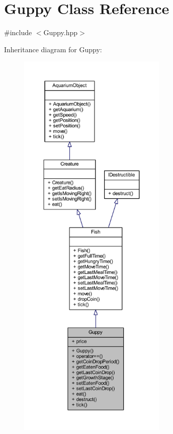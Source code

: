 \hypertarget{class_guppy}{}\section{Guppy Class Reference}
\label{class_guppy}


{\ttfamily \#include $<$Guppy.\+hpp$>$}



Inheritance diagram for Guppy\+:
\nopagebreak
\begin{figure}[H]
\begin{center}
\leavevmode
\includegraphics[height=550pt]{class_guppy__inherit__graph}
\end{center}
\end{figure}


